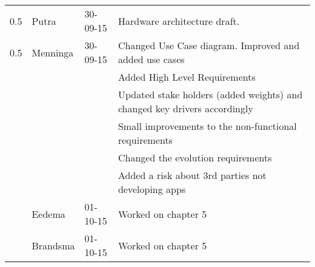 \begin{longtable}{L{} L{} L{} L{}}
	0.5              & Putra                 & 30-09-15      & Hardware architecture draft.                                                                                                                                                                                               \\
	0.5              & Menninga              & 30-09-15      & Changed Use Case diagram. Improved and added use cases                                                                                                                                                                     \\
	                 &                       &               & Added High Level Requirements                                                                                                                                                                                              \\
	                 &                       &               & Updated stake holders (added weights) and changed key drivers accordingly                                                                                                                                                  \\
	                 &                       &               & Small improvements to the non-functional requirements                                                                                                                                                                      \\
	                 &                       &               & Changed the evolution requirements                                                                                                                                                                                         \\
	                 &                       &               & Added a risk about 3rd parties not developing apps                                                                                                                                                                         \\
	                 & Eedema                & 01-10-15      & Worked on chapter 5                                                                                                                                                                                                        \\
	                 & Brandsma              & 01-10-15      & Worked on chapter 5                                                                                                                                                                                                        \\

\end{longtable}
